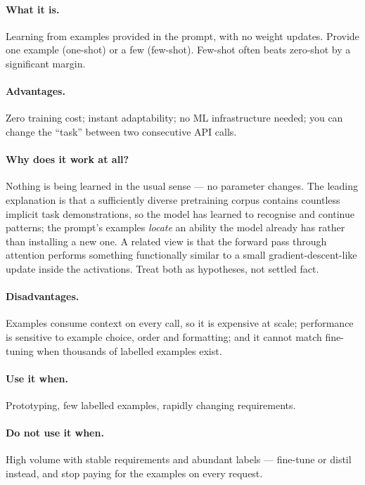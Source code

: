 \documentclass[11pt,a4paper]{article}
\begin{document}
\paragraph{What it is.} Learning from examples provided in the prompt, with no weight updates.
Provide one example (one-shot) or a few (few-shot). Few-shot often beats zero-shot by a
significant margin.

\paragraph{Advantages.} Zero training cost; instant adaptability; no ML infrastructure needed;
you can change the ``task'' between two consecutive API calls.

\paragraph{Why does it work at all?} Nothing is being learned in the usual sense --- no
parameter changes. The leading explanation is that a sufficiently diverse pretraining corpus
contains countless implicit task demonstrations, so the model has learned to recognise and
continue patterns; the prompt's examples \emph{locate} an ability the model already has rather
than installing a new one. A related view is that the forward pass through attention performs
something functionally similar to a small gradient-descent-like update inside the activations.
Treat both as hypotheses, not settled fact.

\paragraph{Disadvantages.} Examples consume context on every call, so it is expensive at scale;
performance is sensitive to example choice, order and formatting; and it cannot match
fine-tuning when thousands of labelled examples exist.

\paragraph{Use it when.} Prototyping, few labelled examples, rapidly changing requirements.
\paragraph{Do not use it when.} High volume with stable requirements and abundant labels ---
fine-tune or distil instead, and stop paying for the examples on every request.
\end{document}
